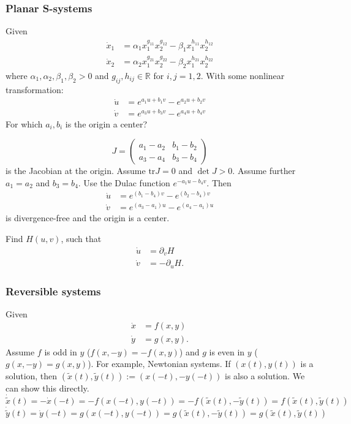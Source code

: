 \documentclass{article}
\newcommand*{\R}{\mathbb{R}}
\newcommand*{\tr}{\text{tr}}
\newcommand*{\mattwo}[4]{\begin{pmatrix}
    #1&#2\\#3&#4
\end{pmatrix}}
\begin{document}
\subsubsection{Planar S-systems}

Given
$$\begin{aligned}
    \dot x_1 &= \alpha_1 x_1^{g_{11}}x_2^{g_{12}}-\beta_1x_1^{h_{11}}x_2^{h_{12}}\\
    \dot x_2 &= \alpha_2 x_1^{g_{21}}x_2^{g_{22}}-\beta_2x_1^{h_{21}}x_2^{h_{22}}
\end{aligned}$$
where $\alpha_1, \alpha_2, \beta_1, \beta_2 > 0$ and $g_{ij}, h_{ij} \in \R$ for $i,j = 1,2$. With some nonlinear transformation:
$$\begin{aligned}
    \dot u &= e^{a_1u+b_1v}-e^{a_2u+b_2v}\\
    \dot v &= e^{a_3u+b_3v}-e^{a_4u+b_4v}
\end{aligned}$$
For which $a_i,b_i$ is the origin a center?

$$J=\mattwo{a_1-a_2}{b_1-b_2}{a_3-a_4}{b_3-b_4}$$
is the Jacobian at the origin. Assume $\tr J=0$ and $\det J > 0$. Assume further $a_1=a_2$ and $b_3=b_4$. Use the Dulac function $e^{-a_1u-b_4v}$. Then
$$\begin{aligned}
    \dot u &= e^{(b_1-b_4)v}-e^{(b_2-b_4)v}\\
    \dot v &= e^{(a_3-a_1)u}-e^{(a_4-a_1)u}
\end{aligned}$$
is divergence-free and the origin is a center.

\begin{hw}
    Find $H(u,v)$, such that
    $$\begin{aligned}
        \dot u &= \partial_v H\\
        \dot v &= -\partial_u H.
    \end{aligned}$$
\end{hw}

\subsubsection{Reversible systems}

Given
$$\begin{aligned}
    \dot x &= f(x,y)\\
    \dot y &= g(x,y).
\end{aligned}$$
Assume $f$ is odd in $y$ ($f(x,-y) = -f(x,y)$) and $g$ is even in $y$ ($g(x,-y) = g(x,y)$). For example, Newtonian systems. If $(x(t), y(t))$ is a solution, then $(\tilde x(t), \tilde y(t)):=(x(-t),-y(-t))$ is also a solution. We can show this directly.
$$\dot{\tilde x}(t) = -\dot x(-t)=-f(x(-t),y(-t))=-f(\tilde x(t),-\tilde y(t)) = f(\tilde x(t),\tilde y(t))$$
$$\dot{\tilde y}(t) = \dot y(-t)=g(x(-t),y(-t))=g(\tilde x(t),-\tilde y(t)) = g(\tilde x(t),\tilde y(t))$$
\end{document}
